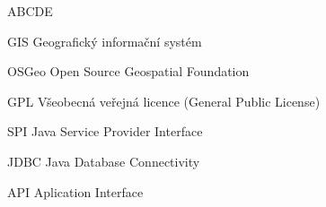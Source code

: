 
\begin{seznamzkratek}{ABCDE}

	      {GIS}
	      {Geografický informační systém}

	      {OSGeo}
	      {Open Source Geospatial Foundation}

	      {GPL}
	      {Všeobecná veřejná licence (General Public License)}
	      
	      {SPI}
	      {Java Service Provider Interface}
	      
	      {JDBC}
	      {Java Database Connectivity}
	      
	      {API}
	      {Aplication Interface}

\end{seznamzkratek}